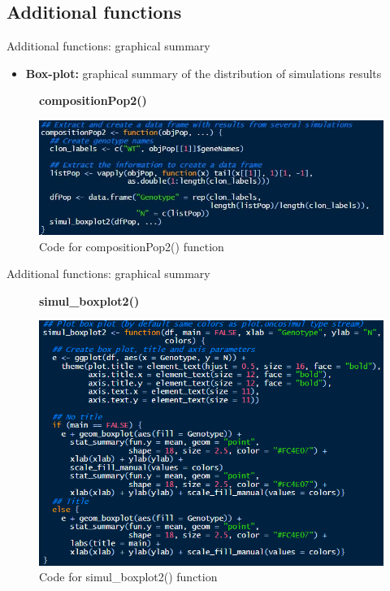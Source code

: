 \subsection{Additional functions}

\begin{frame}{Additional functions: graphical summary}
    \begin{itemize}
        \item \textbf{Box-plot:} graphical summary of the distribution of simulations results
    \end{itemize}
    \begin{figure}[t]
        \textbf{compositionPop2()}\par\medskip
        \includegraphics[width=0.8\linewidth]{img/compositionPop2.PNG}
        \caption{Code for compositionPop2() function}
    \end{figure}
\end{frame}

\begin{frame}{Additional functions: graphical summary}
    \begin{figure}[t]
        \textbf{simul\_boxplot2()}\par\medskip
        \includegraphics[width=0.7\linewidth]{img/simul_boxplot.PNG}
        \caption{Code for simul\_boxplot2() function}
    \end{figure}
\end{frame}

